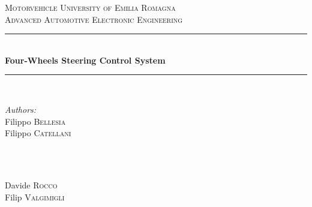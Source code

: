 \begin{titlepage}

\newcommand{\HRule}{\rule{\linewidth}{0.5mm}} %

\center %
 

\textsc{\LARGE Motorvehicle University of Emilia Romagna}\\[1.35 cm] %
\textsc{\Large Advanced Automotive Electronic Engineering}\\[0.5cm] %


\HRule \\[0.4cm]
{ \huge \bfseries Four-Wheels Steering Control System}\\[0.4cm] %
\HRule \\[1.5cm]
 

\begin{minipage}{0.4\textwidth}
\begin{flushleft} \large
\emph{Authors:}\\
Filippo \textsc{Bellesia} \\

Filippo \textsc{Catellani}  \\

\end{flushleft}
\end{minipage}
~
\begin{minipage}{0.4\textwidth}
	\begin{flushright} \large
	\emph{}\\	
Davide \textsc{Rocco} \\

Filip \textsc{Valgimigli}  \\	

	\end{flushright}
\end{minipage}


\end{titlepage}

